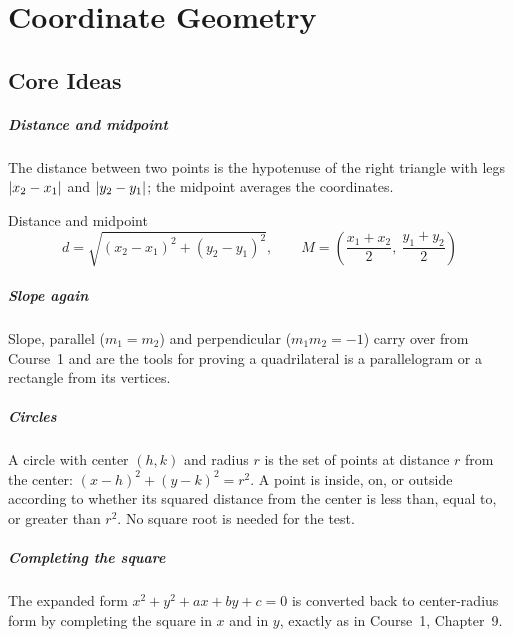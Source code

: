 \chapter{Coordinate Geometry}


\section{Core Ideas}

\paragraph{Distance and midpoint} The distance between two points is the hypotenuse of the right triangle with legs $\lvert x_2 - x_1 \rvert$ and $\lvert y_2 - y_1 \rvert$; the midpoint averages the coordinates.

\begin{keybox}{Distance and midpoint}
\[
d = \sqrt{(x_2 - x_1)^2 + (y_2 - y_1)^2}, \qquad M = \left(\frac{x_1 + x_2}{2},\ \frac{y_1 + y_2}{2}\right)
\]
\end{keybox}

\paragraph{Slope again} Slope, parallel ($m_1 = m_2$) and perpendicular ($m_1 m_2 = -1$) carry over from Course~1 and are the tools for proving a quadrilateral is a parallelogram or a rectangle from its vertices.

\paragraph{Circles} A circle with center $(h, k)$ and radius $r$ is the set of points at distance $r$ from the center: $(x - h)^2 + (y - k)^2 = r^2$. A point is inside, on, or outside according to whether its squared distance from the center is less than, equal to, or greater than $r^2$. No square root is needed for the test.

\paragraph{Completing the square} The expanded form $x^2 + y^2 + ax + by + c = 0$ is converted back to center-radius form by completing the square in $x$ and in $y$, exactly as in Course~1, Chapter~9.

